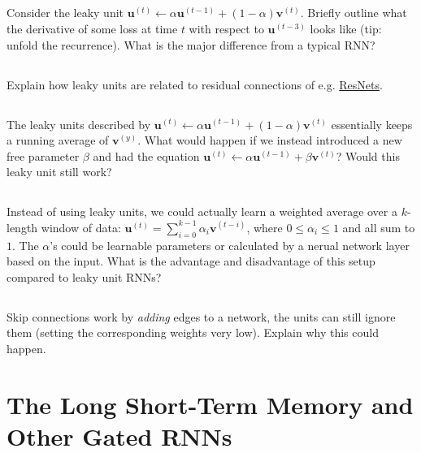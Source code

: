 \documentclass[a4paper]{report}
\renewcommand{\vec}[1]{{\boldsymbol{#1}}}
\newcommand{\tvec}[2]{{\vec{#1}^{(#2)}}}
\begin{document}
    \subsection{} Consider the leaky unit $\tvec{u}{t} \leftarrow \alpha \tvec{u}{t-1} + (1-\alpha)\tvec{v}{t}$. Briefly outline what the derivative of some loss at time $t$ with respect to $\tvec{u}{t-3}$ looks like (tip: unfold the recurrence). What is the major difference from a typical RNN?

    \subsection{} Explain how leaky units are related to residual connections of e.g. \href{https://arxiv.org/abs/1512.03385}{ResNets}.

    \subsection{} The leaky units described by $\tvec{u}{t} \leftarrow \alpha \tvec{u}{t-1} + (1-\alpha)\tvec{v}{t}$ essentially keeps a running average of $\tvec{v}{y}$. What would happen if we instead introduced a new free parameter $\beta$ and had the equation $\tvec{u}{t} \leftarrow \alpha \tvec{u}{t-1} + \beta\tvec{v}{t}$? Would this leaky unit still work?

    \subsection{} Instead of using leaky units, we could actually learn a weighted average over a $k$-length window of data: $\tvec{u}{t} = \sum_{i=0}^{k-1} \alpha_i \tvec{v}{t-i}$, where $0 \leq \alpha_i \leq 1$ and all sum to $1$. The $\alpha$'s could be learnable parameters or calculated by a nerual network layer based on the input. What is the advantage and disadvantage of this setup compared to leaky unit RNNs?

    \subsection{}
    Skip connections work by \emph{adding} edges to a network, the units can still ignore them (setting the corresponding weights very low). Explain why this could happen.

    \section{The Long Short-Term Memory and Other Gated RNNs}
\end{document}
